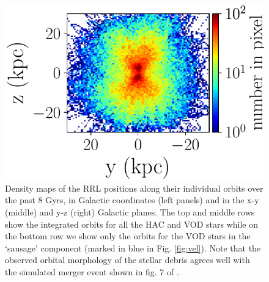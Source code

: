 \documentclass[a4paper,useAMS,usenatbib]{mnras}
\begin{document}
\begin{figure}
             \includegraphics[scale=0.302]{VOD_orbits_8Gyrs_yz_sausage.pdf}
\vspace{-0.45cm}
   \caption{Density maps of the RRL positions along their
     individual orbits over the past 8 Gyrs, in Galactic coordinates (left panels) and in the x-y (middle) and y-z (right) Galactic
     planes.  The top and middle rows show the integrated orbits for
     all the HAC and VOD stars while on the bottom row we show only
     the orbits for the VOD stars in the `sausage' component (marked
     in blue in Fig. \ref{fig:vel}). Note that the observed orbital
     morphology of the stellar debris agrees well with the simulated
     merger event shown in fig. 7 of \citet{Simion2018}.}
    \label{fig:backorbits}
\end{figure}
%
%
\end{document}
